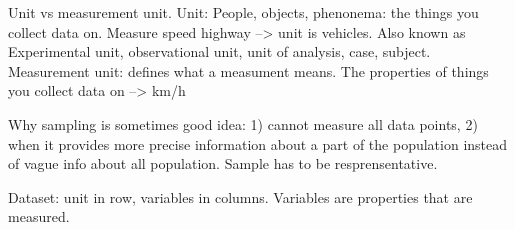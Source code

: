 Unit vs measurement unit.
Unit: People, objects, phenonema: the things you collect data on. Measure speed highway --> unit is vehicles. Also known as Experimental unit, observational unit, unit of analysis, case, subject.
Measurement unit: defines what a measument means. The properties of things you collect data on --> km/h

Why sampling is sometimes good idea: 1) cannot measure all data points, 2) when it provides more precise information about a part of the population instead of vague info about all population. 
Sample has to be resprensentative. 

Dataset: unit in row, variables in columns. Variables are properties that are measured.


